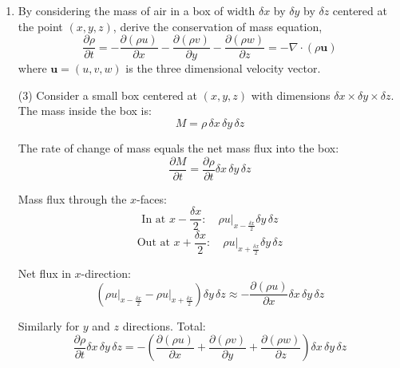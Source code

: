 \documentclass[letterpaper, 11pt]{article}
\newcommand{\1}{\mathds{1}}	%
\theoremstyle{definition}
\begin{document}
\begin{enumerate}
The engine provides a constant northward acceleration $C$. However, the Coriolis term $fu$ acts to oppose the northward motion (it deflects eastward-moving air to the right in the Northern Hemisphere, which for a northward-moving parcel means opposing the northward motion).

Eventually, when $fu = C$, we have:
\[
\frac{\partial v}{\partial t} = C - fu = 0
\]

At this point, the plane cannot accelerate northward anymore. As $u$ continues to grow (if the plane keeps moving north), $fu > C$, which means $\frac{\partial v}{\partial t} < 0$, and the plane decelerates until $v = 0$.

\textbf{Conclusion:} The Coriolis force eventually balances the engine thrust, preventing further northward acceleration, and the plane stops moving northward.

\item By considering the mass of air in a box of width $\delta x$ by $\delta y$ by $\delta z$ centered at the point $(x, y, z)$, derive the conservation of mass equation,
\[
\frac{\partial \rho}{\partial t} = -\frac{\partial(\rho u)}{\partial x} - \frac{\partial(\rho v)}{\partial y} - \frac{\partial(\rho w)}{\partial z} = -\nabla \cdot (\rho \mathbf{u})
\]
where $\mathbf{u} = (u, v, w)$ is the three dimensional velocity vector.

(3)
Consider a small box centered at $(x, y, z)$ with dimensions $\delta x \times \delta y \times \delta z$. The mass inside the box is:
\[
M = \rho \, \delta x \, \delta y \, \delta z
\]

The rate of change of mass equals the net mass flux into the box:
\[
\frac{\partial M}{\partial t} = \frac{\partial \rho}{\partial t} \delta x \, \delta y \, \delta z
\]

Mass flux through the $x$-faces:
\[
\text{In at } x - \frac{\delta x}{2}: \quad \rho u \Big|_{x-\frac{\delta x}{2}} \delta y \, \delta z
\]
\[
\text{Out at } x + \frac{\delta x}{2}: \quad \rho u \Big|_{x+\frac{\delta x}{2}} \delta y \, \delta z
\]

Net flux in $x$-direction:
\[
\left(\rho u \Big|_{x-\frac{\delta x}{2}} - \rho u \Big|_{x+\frac{\delta x}{2}}\right) \delta y \, \delta z \approx -\frac{\partial(\rho u)}{\partial x} \delta x \, \delta y \, \delta z
\]

Similarly for $y$ and $z$ directions. Total:
\[
\frac{\partial \rho}{\partial t} \delta x \, \delta y \, \delta z = -\left(\frac{\partial(\rho u)}{\partial x} + \frac{\partial(\rho v)}{\partial y} + \frac{\partial(\rho w)}{\partial z}\right) \delta x \, \delta y \, \delta z
\]


\end{enumerate}
\end{document}
